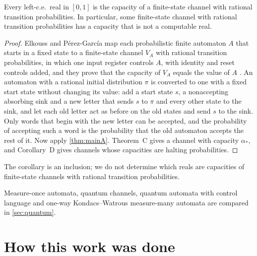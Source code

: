 \documentclass[11pt]{article}
\theoremstyle{plain}
\theoremstyle{definition}
\theoremstyle{remark}
\begin{document}
\begin{corollary}\label{cor:channel}
Every left-c.e.\ real in $[0,1]$ is the capacity of a finite-state channel with rational transition probabilities. In particular, some finite-state channel with rational transition probabilities has a capacity that is not a computable real.
\end{corollary}

\begin{proof}
Elkouss and P\'erez-Garc\'ia map each probabilistic finite automaton $A$ that starts in a fixed state to a finite-state channel $V_A$ with rational transition probabilities, in which one input register controls $A$, with identity and reset controls added, and they prove that the capacity of $V_A$ equals the value of $A$ \cite[Theorem~1]{EPG18}. An automaton with a rational initial distribution $\pi$ is converted to one with a fixed start state without changing its value: add a start state $s$, a nonaccepting absorbing sink and a new letter that sends $s$ to $\pi$ and every other state to the sink, and let each old letter act as before on the old states and send $s$ to the sink. Only words that begin with the new letter can be accepted, and the probability of accepting such a word is the probability that the old automaton accepts the rest of it. Now apply \cref{thm:mainA}. Theorem~C gives a channel with capacity $\alpha_*$, and Corollary~D gives channels whose capacities are halting probabilities.
\end{proof}

The corollary is an inclusion; we do not determine which reals are capacities of finite-state channels with rational transition probabilities.

Measure-once automata, quantum channels, quantum automata with control language and one-way Kondacs--Watrous measure-many automata are compared in \cref{sec:quantum}.

\section*{How this work was done}
\end{document}
